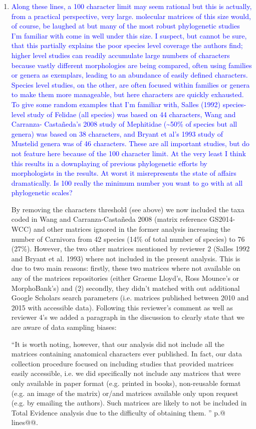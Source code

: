 \documentclass[12pt,letterpaper]{article}
\begin{document}
\begin{enumerate}
\item{\textcolor{blue}{Along these lines, a 100 character limit may seem rational but this is actually, from a practical perspective, very large. molecular matrices of this size would, of course, be laughed at but many of the most robust phylogenetic studies I'm familiar with come in well under this size. I suspect, but cannot be sure, that this partially explains the poor species level coverage the authors find; higher level studies can readily accumulate large numbers of characters because vastly different morphologies are being compared, often using families or genera as exemplars, leading to an abundance of easily defined characters. Species level studies, on the other, are often focused within families or genera to make them more manageable, but here characters are quickly exhausted. To give some random examples that I'm familiar with, Salles (1992) species-level study of Felidae (all species) was based on 44 characters, Wang and Carranza- Casta\~{n}eda's 2008 study of Mephitidae (\textasciitilde50\% of species but all genera) was based on 38 characters, and Bryant et al's 1993 study of Mustelid genera was of 46 characters. These are all important studies, but do not feature here because of the 100 character limit. At the very least I think this results in a downplaying of previous phylogenetic efforts by morphologists in the results. At worst it misrepresents the state of affairs dramatically. Is 100 really the minimum number you want to go with at all phylogenetic scales?}}

By removing the characters threshold (see above) we now included the taxa coded in Wang and Carranza-Casta\~{n}eda 2008 (matrix reference GS2014-WCC) and other matrices ignored in the former analysis increasing the number of Carnivora from 42 species (14\% of total number of species) to 76 (27\%).
However, the two other matrices mentioned by reviewer 2 (Salles 1992 and Bryant et al. 1993) where not included in the present analysis.
This is due to two main reasons: firstly, these two matrices where not available on any of the matrices repositories (either Graeme Lloyd's, Ross Mounce's or MorphoBank's) and (2) secondly, they didn't matched with out additional Google Scholars search parameters (i.e. matrices published between 2010 and 2015 with accessible data).
Following this reviewer's comment as well as reviewer 4's we added a paragraph in the discussion to clearly state that we are aware of data sampling biases:

``It is worth noting, however, that our analysis did not include all the matrices containing anatomical characters ever published.
In fact, our data collection procedure focused on including studies that provided matrices easily accessible, i.e. we did specifically not include any matrices that were only available in paper format (e.g. printed in books), non-reusable format (e.g. an image of the matrix) %
or/and matrices available only upon request (e.g. by emailing the authors).
Such matrices are likely to not be included in Total Evidence analysis due to the difficulty of obtaining them.
'' p.@ lines@@.



\end{enumerate}
\end{document}
